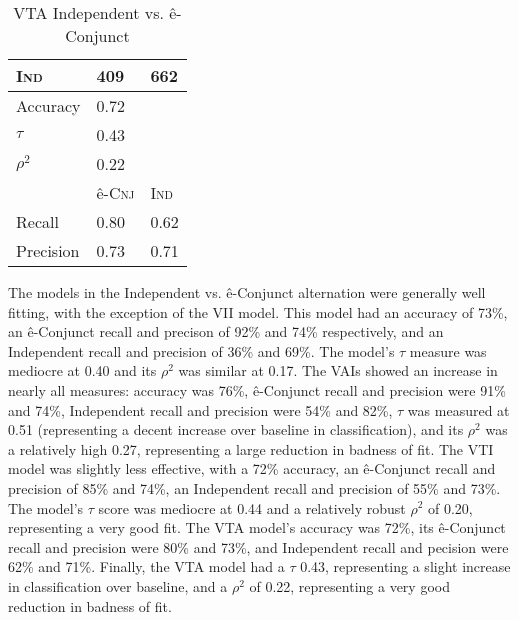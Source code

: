 \begin{table}[H]
\begin{floatrow}[2]
{\begin{tabular}{lll}
\textsc{Ind}           & 409                & 662                    \\
                     \midrule
                     \midrule
Accuracy             & 0.72               &                       \\
$\tau$               & 0.43               &                       \\
$\rho^{2}$           & 0.22               &                       \\
                     \midrule
                     \midrule
                     & ê-\textsc{Cnj}     & \textsc{Ind}           \\
Recall               & 0.80               & 0.62                  \\
Precision            & 0.73               & 0.71 \\
                \bottomrule
                \end{tabular}}
    {\caption{VTA Independent vs. ê-Conjunct}
      \label{vtaivcms}}
  \end{floatrow}
\end{table}%

The models in the Independent vs. ê-Conjunct alternation were generally well fitting, with the exception of the VII model. This model had an accuracy of 73\%, an ê-Conjunct recall and precison of 92\% and 74\% respectively, and an Independent recall and precision of 36\% and 69\%. The model's $\tau$ measure was mediocre at 0.40 and its $\rho^{2}$ was similar at 0.17. The VAIs showed an increase in nearly all measures: accuracy was 76\%, ê-Conjunct recall and precision were 91\% and 74\%, Independent recall and precision were 54\% and 82\%, $\tau$ was measured at 0.51 (representing a decent increase over baseline in classification), and its $\rho^{2}$ was a relatively high 0.27, representing a large reduction in badness of fit. The VTI model was slightly less effective, with a 72\% accuracy, an ê-Conjunct recall and precision of 85\% and 74\%, an Independent recall and precision of 55\% and 73\%. The model's $\tau$ score was mediocre at 0.44 and a relatively robust $\rho^{2}$ of 0.20, representing a very good fit. The VTA model's accuracy was 72\%, its ê-Conjunct recall and precision were 80\% and 73\%, and Independent recall and pecision were 62\% and 71\%. Finally, the VTA model had a $\tau$ 0.43, representing a slight increase in classification over baseline, and a $\rho^{2}$ of 0.22, representing a very good reduction in badness of fit. 


\FloatBarrier


